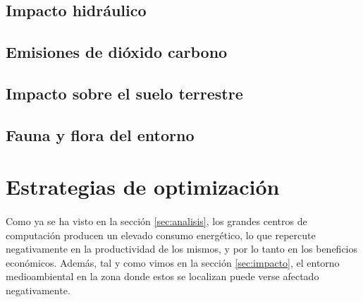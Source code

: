\documentclass[10pt]{article}
\begin{document}
	  	\paragraph{}

	  \subsection{Impacto hidráulico}
	  	\paragraph{}

	  \subsection{Emisiones de dióxido carbono}
	  	\paragraph{}

	  \subsection{Impacto sobre el suelo terrestre}
	  	\paragraph{}

	  \subsection{Fauna y flora del entorno}
	  	\paragraph{}



  \section{Estrategias de optimización}
	\label{sec:estrategias}

  	\paragraph{}
		Como ya se ha visto en la sección \ref{sec:analisis}, los grandes centros de computación producen un elevado consumo energético, lo que repercute negativamente en la productividad de los mismos, y por lo tanto en los beneficios económicos. Además, tal y como vimos en la sección \ref{sec:impacto}, el entorno medioambiental en la zona donde estos se localizan puede verse afectado negativamente.
\end{document}
